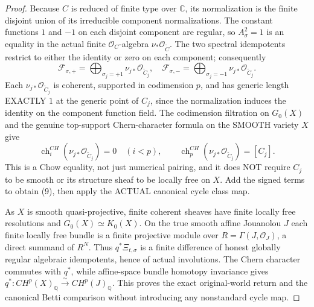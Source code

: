 \documentclass[11pt]{article}
\begin{document}
\begin{proof}
Because $C$ is reduced of finite type over
$\mathbb C$, its normalization is the finite
disjoint union of its irreducible component
normalizations. The constant functions
$1$ and $-1$ on each disjoint component
are regular, so $A_\sigma^2=1$ is an equality
in the actual finite $\mathcal O_C$-algebra
$\nu_*\mathcal O_{\widetilde C}$.
The two spectral idempotents restrict to
either the identity or zero on each component;
consequently
\[
 \mathcal F_{\sigma,+}
 =\bigoplus_{\sigma_j=+1}\nu_{j*}\mathcal O_{\widetilde C_j},
 \quad
 \mathcal F_{\sigma,-}
 =\bigoplus_{\sigma_j=-1}\nu_{j*}\mathcal O_{\widetilde C_j}.
\]
Each $\nu_{j*}\mathcal O_{\widetilde C_j}$
is coherent, supported in codimension $p$,
and has generic length EXACTLY $1$
at the generic point of $C_j$, since the
normalization induces the identity on
the component function field.
The codimension filtration on $G_0(X)$
and the genuine top-support Chern-character
formula on the SMOOTH variety $X$ give
\[
 \operatorname{ch}^{CH}_{i}
    (\nu_{j*}\mathcal O_{\widetilde C_j})=0
       \quad(i<p),\qquad
 \operatorname{ch}^{CH}_{p}
    (\nu_{j*}\mathcal O_{\widetilde C_j})=[C_j].
\]
This is a Chow equality, not just numerical
pairing, and it does NOT require $C_j$ to be
smooth or its structure sheaf to be locally
free on $X$. Add the signed terms to obtain
(9), then apply the ACTUAL canonical cycle
class map.

As $X$ is smooth quasi-projective,
finite coherent sheaves have finite locally
free resolutions and $G_0(X)\simeq K_0(X)$.
On the true smooth affine Jouanolou $J$
each finite locally free bundle is a finite
projective module over $R=\Gamma(J,\mathcal O_J)$,
a direct summand of $R^N$. Thus
$q^*\Xi_{t,\sigma}$ is a finite difference
of honest globally regular algebraic
idempotents, hence of actual involutions.
The Chern character commutes with $q^*$,
while affine-space bundle homotopy
invariance gives
$q^*:CH^p(X)_{\mathbb Q}
 \xrightarrow{\sim}CH^p(J)_{\mathbb Q}$.
This proves the exact original-world
return and the canonical Betti comparison
without introducing any nonstandard cycle map.
\end{proof}
\end{document}
